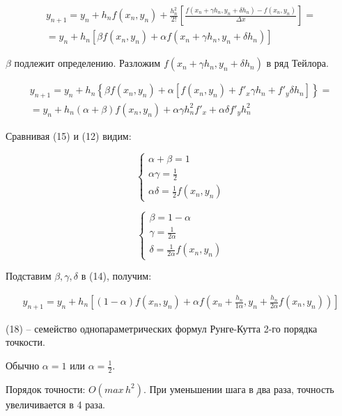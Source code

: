 \documentclass[a4paper,14pt]{article}
\begin{document}
\begin{eqnarray}
	y_{n+1} = y_n + h_n f(x_n, y_n) + \frac{h_n^2}{2!} \left[\frac{ f(x_n + \gamma h_n, y_n + \delta h_n) - f(x_n, y_n) }{ \Delta x }\right] = \nonumber \\
	= y_n + h_n \left[ \beta f(x_n, y_n) + \alpha f(x_n + \gamma h_n, y_n + \delta h_n) \right]
\end{eqnarray}

$\beta$ подлежит определению. Разложим $f(x_n + \gamma h_n, y_n + \delta h_n)$ 
в ряд Тейлора.

\begin{eqnarray}
	y_{n+1} = y_n + h_n \left\{ \beta f(x_n, y_n) + \alpha \left[ f(x_n, y_n) + f'_x \gamma h_n + f'_y \delta h_n \right] \right\} = \nonumber \\
	= y_n + h_n(\alpha + \beta) f(x_n, y_n) + \alpha \gamma h_n^2 f'_x + \alpha \delta f'_y h_n^2
\end{eqnarray}

Сравнивая (15) и (12) видим:

\begin{equation}
	\begin{cases}
		\alpha + \beta = 1 \\
		\alpha \gamma = \frac{1}{2} \\
		\alpha \delta = \frac{1}{2} f(x_n, y_n)
	\end{cases}
\end{equation}

\begin{equation}
	\begin{cases}
		\beta = 1 - \alpha \\
		\gamma = \frac{1}{2 \alpha} \\
		\delta = \frac{1}{2 \alpha} f(x_n, y_n)
	\end{cases}
\end{equation}

Подставим $\beta, \gamma, \delta$ в (14), получим:

\begin{eqnarray}
	y_{n+1} = y_n + h_n \left[ (1 - \alpha) f(x_n, y_n) + \alpha f(x_n + \frac{h_n}{1 \alpha}, y_n + \frac{h_n}{2 \alpha} f(x_n, y_n) ) \right]
\end{eqnarray}

(18) -- семейство однопараметрических формул Рунге-Кутта 2-го порядка точкости.

Обычно $\alpha = 1$ или $\alpha = \frac{1}{2}$.

Порядок точности: $O(max \, h^2)$. При уменьшении шага в два раза,
точность увеличивается в 4 раза.
\end{document}
